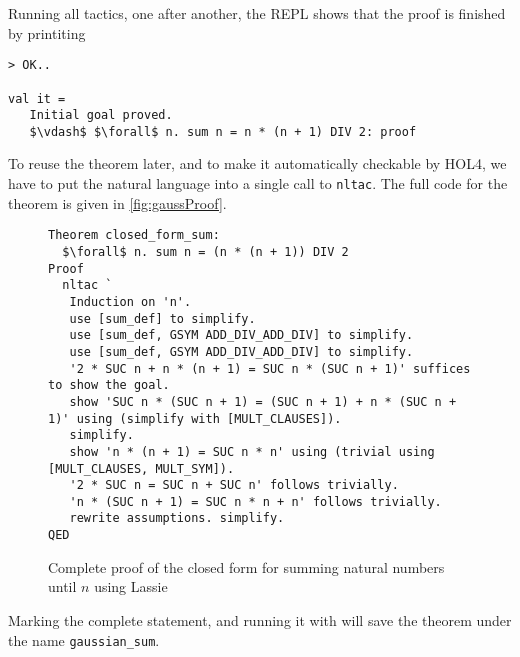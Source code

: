 Running all tactics, one after another, the REPL shows that the proof is finished by printiting
\begin{lstlisting}
> OK..

val it =
   Initial goal proved.
   $\vdash$ $\forall$ n. sum n = n * (n + 1) DIV 2: proof
\end{lstlisting}

To reuse the theorem later, and to make it automatically checkable by HOL4, we
have to put the natural language into a single call to \lstinline{nltac}.
The full code for the theorem is given in \autoref{fig:gaussProof}.
%
\begin{figure}[t]
\begin{lstlisting}[mathescape=true]
Theorem closed_form_sum:
  $\forall$ n. sum n = (n * (n + 1)) DIV 2
Proof
  nltac `
   Induction on 'n'.
   use [sum_def] to simplify.
   use [sum_def, GSYM ADD_DIV_ADD_DIV] to simplify.
   use [sum_def, GSYM ADD_DIV_ADD_DIV] to simplify.
   '2 * SUC n + n * (n + 1) = SUC n * (SUC n + 1)' suffices to show the goal.
   show 'SUC n * (SUC n + 1) = (SUC n + 1) + n * (SUC n + 1)' using (simplify with [MULT_CLAUSES]).
   simplify.
   show 'n * (n + 1) = SUC n * n' using (trivial using [MULT_CLAUSES, MULT_SYM]).
   '2 * SUC n = SUC n + SUC n' follows trivially.
   'n * (SUC n + 1) = SUC n * n + n' follows trivially.
   rewrite assumptions. simplify.
QED
\end{lstlisting}
\caption{Complete proof of the closed form for summing natural numbers until $n$ using Lassie}\label{fig:gaussProof}
\end{figure}

Marking the complete statement, and running it with  will save the
theorem under the name \lstinline{gaussian_sum}.
